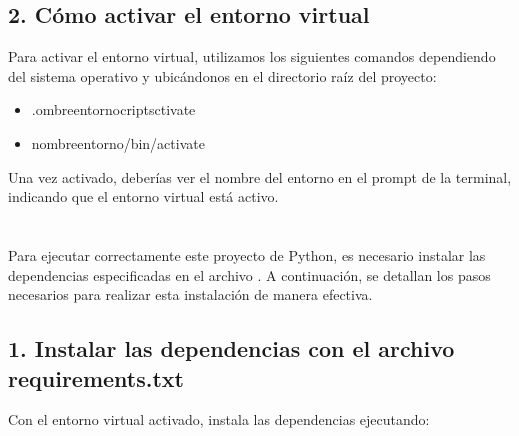 \documentclass[a4paper,10pt,spanish]{sphinxmanual}
\begin{document}
\subsection{2. Cómo activar el entorno virtual}
\label{\detokenize{configuracion_inicial/001.env:como-activar-el-entorno-virtual}}
\sphinxAtStartPar
Para activar el entorno virtual, utilizamos los siguientes comandos dependiendo del sistema operativo y ubicándonos en el directorio raíz del proyecto:
\begin{itemize}
\item {} 
\sphinxAtStartPar
{}

\begin{sphinxVerbatim}[commandchars=\\\{\}]
.ombre\PYGZus{}entornocriptsctivate
\end{sphinxVerbatim}

\item {} 
\sphinxAtStartPar
{}

\begin{sphinxVerbatim}[commandchars=\\\{\}]
nombre\PYGZus{}entorno/bin/activate
\end{sphinxVerbatim}

\end{itemize}

\sphinxAtStartPar
Una vez activado, deberías ver el nombre del entorno en el prompt de la terminal, indicando que el entorno virtual está activo.

\sphinxstepscope


\section{}
\label{\detokenize{configuracion_inicial/002.instalacion_librerias:instalacion-de-dependencias-del-proyecto}}\label{\detokenize{configuracion_inicial/002.instalacion_librerias::doc}}
\sphinxAtStartPar
Para ejecutar correctamente este proyecto de Python, es necesario instalar las dependencias especificadas en el archivo . A continuación, se detallan los pasos necesarios para realizar esta instalación de manera efectiva.


\subsection{1. Instalar las dependencias con el archivo requirements.txt}
\label{\detokenize{configuracion_inicial/002.instalacion_librerias:instalar-las-dependencias-con-el-archivo-requirements-txt}}
\sphinxAtStartPar
Con el entorno virtual activado, instala las dependencias ejecutando:
\end{document}
